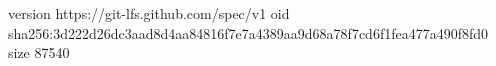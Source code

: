 version https://git-lfs.github.com/spec/v1
oid sha256:3d222d26dc3aad8d4aa84816f7e7a4389aa9d68a78f7cd6f1fea477a490f8fd0
size 87540

